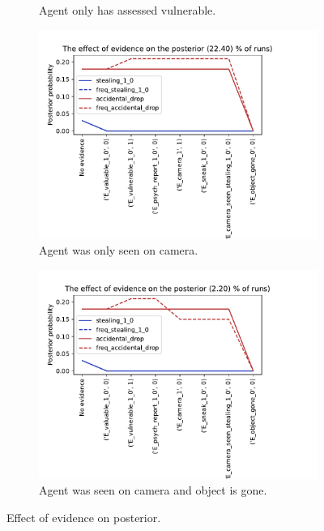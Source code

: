 \begin{enumerate}
\begin{figure}[htbp]
\begin{center}
\begin{subfigure}{.66\textwidth}
\caption{Agent only has assessed vulnerable.}
\label{default}
\end{subfigure}
\begin{subfigure}{.66\textwidth}
\includegraphics[width=\linewidth]{../experiments/GroteMarkt/plots/evidence_progress_GroteMarkt_3.pdf}
\caption{Agent was only seen on camera.}
\label{default}
\end{subfigure}%
\begin{subfigure}{.66\textwidth}
\includegraphics[width=\linewidth]{../experiments/GroteMarkt/plots/evidence_progress_GroteMarkt_4.pdf}
\caption{Agent was seen on camera and object is gone.}
\label{default}
\end{subfigure}
\caption{Effect of evidence on posterior.}
\label{malthus}
\end{center}
\end{figure}


\end{enumerate}
